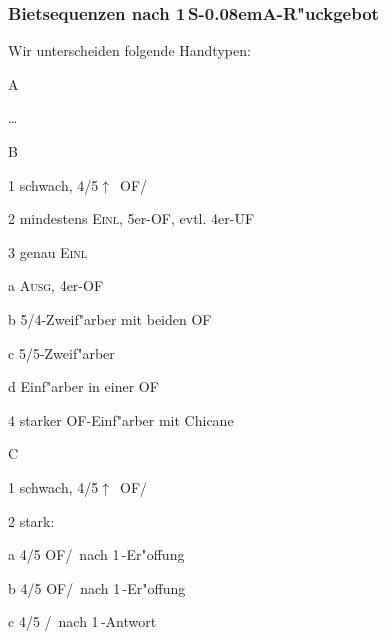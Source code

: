 \documentclass[11pt,german,twocolumn]{scrartcl}
\renewcommand{\Cl}{{\color{ClColor}{$\clubsuit$}}}
\renewcommand{\Di}{{\color{DiColor}{$\vardiamondsuit$}}}
\renewcommand{\He}{{\color{HeColor}{$\varheartsuit$}}}
\renewcommand{\Sp}{{\color{SpColor}{$\spadesuit$}}}
\def\pik{\,\Sp}
\def\kar{\,\Di}
\def\tre{\,\Cl}
\def\pi{\Sp}
\def\co{\He}
\def\ka{\Di}
\def\tr{\Cl}
\def\pl{$\uparrow$}
\def\ufa{\textsf{UF}}
\def\ofa{\textsf{OF}}
\def\SA{\textsf{\,S\kern-0.08emA}}
\def\bal{\textsc{Ausg}}
\def\inv{\textsc{Einl}}
\def\bdsc{\begin{description}}
\def\edsc{\end{description}}
\begin{document}
\subsubsection{Bietsequenzen nach 1\SA-R"uckgebot}

Wir unterscheiden folgende Handtypen:
\bdsc
\item[A]
  \bdsc
  \item \dots
  \edsc
\item[B]
  \bdsc
  \item[1] schwach, 4/5\pl\ \ofa/\ka
  \item[2] mindestens \inv, 5er-\ofa, evtl. 4er-\ufa
  \item[3] genau \inv
    \bdsc
    \item[a] \bal, 4er-\ofa
    \item[b] 5/4-Zweif"arber mit beiden \ofa
    \item[c] 5/5-Zweif"arber
    \item[d] Einf"arber in einer \ofa
    \edsc
  \item[4] starker \ofa-Einf"arber mit Chicane
  \edsc
\item[C]
  \bdsc
  \item[1] schwach, 4/5\pl\ \ofa/\tr
  \item[2] stark:
    \bdsc
    \item[a] 4/5 \ofa/\tr\ nach 1\tre-Er"offung
    \item[b] 4/5 \ofa/\ka\ nach 1\kar-Er"offung
    \item[c] 4/5 \co/\pi\ nach 1\pik-Antwort
    \edsc
  \edsc
\edsc
\end{document}
